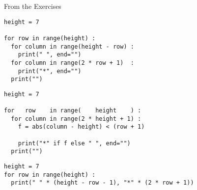 \begin{frame}[fragile]{From the Exercises}
%
\begin{tcbraster}[raster columns=2,
                  raster equal height,
                  nobeforeafter,
                  raster column skip=0.5cm]
\begin{codebox}
\begin{verbatim}
height = 7

for row in range(height) :
  for column in range(height - row) :
    print(" ", end="")
  for column in range(2 * row + 1)  :
    print("*", end="")
  print("")
\end{verbatim}
\end{codebox}
%
\begin{codebox}
\begin{verbatim}
height = 7

for   row    in range(    height    ) :
  for column in range(2 * height + 1) :
    f = abs(column - height) < (row + 1)
    
    print("*" if f else " ", end="")
  print("")
\end{verbatim}
\end{codebox}
\end{tcbraster}
%
\begin{codebox}
\begin{verbatim}
height = 7
for row in range(height) :
  print(" " * (height - row - 1), "*" * (2 * row + 1))
\end{verbatim}
\end{codebox}
%
\end{frame}


